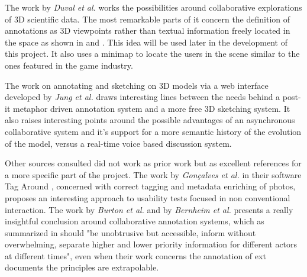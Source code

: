 The work by {\em Duval et al.} \cite{Duval} works the possibilities around collaborative explorations of 3D scientific data. The most remarkable parts of it concern the definition of annotations as 3D viewpoints rather than textual information freely located in the space as shown in \cite{Kadobayashi} and \cite{Sonnet}. This idea will be used later in the development of this project. It also uses a minimap to locate the users in the scene similar to the ones featured in the game industry.

The work on annotating and sketching on 3D models via a web interface developed by {\em Jung et al.} \cite{Jung} draws interesting lines between the needs behind a post-it metaphor driven annotation system and a more free 3D sketching system. It also raises interesting points around the possible advantages of an asynchronous collaborative system and it's support for a more semantic history of the evolution of the model, versus a real-time voice based discussion system.

Other sources consulted did not work as prior work but as excellent references for a more specific part of the project. The work by {\em Gonçalves et al.} in their software Tag Around \cite{Goncalves}, concerned with correct tagging and metadata enriching of photos, proposes an interesting approach to usability tests focused in non conventional interaction. The work by {\em Burton et al.}\cite{Burton} and by {\em Bernheim et al.}\cite{Bernheim} presents a really insightful conclusion around collaborative annotation systems, which as summarized in \cite{Jung} should "be unobtrusive but accessible, inform without overwhelming, separate higher and lower priority information for different actors at different times", even when their work concerns the annotation of ext documents the principles are extrapolable.
